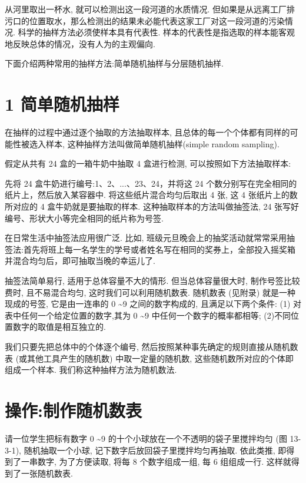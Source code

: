 \documentclass[10pt]{article}
\begin{document}
从河里取出一杯水, 就可以检测出这一段河道的水质情况. 但如果是从远离工厂排污口的位置取水，那么检测出的结果未必能代表这家工厂对这一段河道的污染情况. 科学的抽样方法必须使样本具有代表性. 样本的代表性是指选取的样本能客观地反映总体的情况，没有人为的主观偏向.

下面介绍两种常用的抽样方法:简单随机抽样与分层随机抽样.

\section*{1 简单随机抽样}

在抽样的过程中通过逐个抽取的方法抽取样本, 且总体的每一个个体都有同样的可能性被选入样本, 这种抽样方法叫做简单随机抽样(simple random sampling).

假定从共有 24 盒的一箱牛奶中抽取 4 盒进行检测, 可以按照如下方法抽取样本:

先将 24 盒牛奶进行编号:1、2、...、23、24，并将这 24 个数分别写在完全相同的纸片上，然后放入某容器中. 将这些纸片混合均匀后取出 4 张, 这 4 张纸片上的数所对应的 4 盒牛奶就是要抽取的样本. 这种抽取样本的方法叫做抽签法, 24 张写好编号、形状大小等完全相同的纸片称为号签.

在日常生活中抽签法应用很广泛. 比如, 班级元旦晚会上的抽奖活动就常常采用抽签法:首先将班上每一名学生的学号或者姓名写在相同的奖券上，全部投入摇奖箱并混合均匀后，即可抽取当晚的幸运儿了.



抽签法简单易行, 适用于总体容量不大的情形. 但当总体容量很大时, 制作号签比较费时, 且不易混合均匀, 这时我们可以利用随机数表. 随机数表 (见附录) 就是一种现成的号签, 它是由一连串的 0 \textasciitilde 9 之间的数字构成的, 且满足以下两个条件: (1) 对表中任何一个给定位置的数字,其为 0 \textasciitilde  9 中任何一个数字的概率都相等; (2)不同位置数字的取值是相互独立的.

我们只要先把总体中的个体逐个编号, 然后按照某种事先确定的规则直接从随机数表 (或其他工具产生的随机数) 中取一定量的随机数, 这些随机数所对应的个体即组成一个样本. 我们称这种抽样方法为随机数法.

\section*{操作:制作随机数表}

请一位学生把标有数字 0 \textasciitilde  9 的十个小球放在一个不透明的袋子里搅拌均匀 (图 13-3-1), 随机抽取一个小球, 记下数字后放回袋子里搅拌均匀再抽取. 依此类推, 即得到了一串数字, 为了方便读取, 将每 8 个数字组成一组, 每 6 组组成一行. 这样就得到了一张随机数表.
\end{document}
